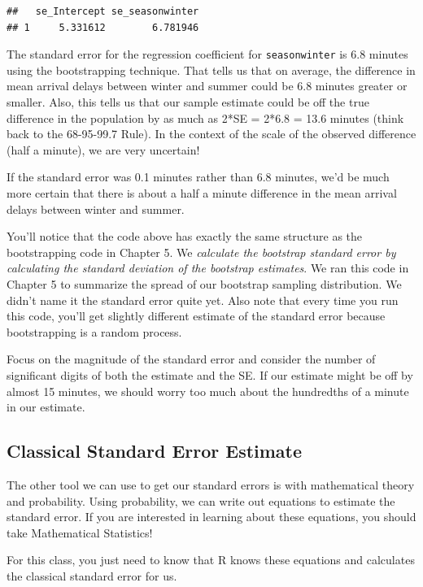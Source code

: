 \documentclass[
]{book}
\begin{document}
\begin{verbatim}
##   se_Intercept se_seasonwinter
## 1     5.331612        6.781946
\end{verbatim}

The standard error for the regression coefficient for \texttt{seasonwinter} is 6.8 minutes using the bootstrapping technique. That tells us that on average, the difference in mean arrival delays between winter and summer could be 6.8 minutes greater or smaller. Also, this tells us that our sample estimate could be off the true difference in the population by as much as 2*SE = 2*6.8 = 13.6 minutes (think back to the 68-95-99.7 Rule). In the context of the scale of the observed difference (half a minute), we are very uncertain!

If the standard error was 0.1 minutes rather than 6.8 minutes, we'd be much more certain that there is about a half a minute difference in the mean arrival delays between winter and summer.

You'll notice that the code above has exactly the same structure as the bootstrapping code in Chapter 5. We \emph{calculate the bootstrap standard error by calculating the standard deviation of the bootstrap estimates}. We ran this code in Chapter 5 to summarize the spread of our bootstrap sampling distribution. We didn't name it the standard error quite yet. Also note that every time you run this code, you'll get slightly different estimate of the standard error because bootstrapping is a random process.

Focus on the magnitude of the standard error and consider the number of significant digits of both the estimate and the SE. If our estimate might be off by almost 15 minutes, we should worry too much about the hundredths of a minute in our estimate.

\hypertarget{classical-standard-error-estimate}{%
\subsection{Classical Standard Error Estimate}\label{classical-standard-error-estimate}}

The other tool we can use to get our standard errors is with mathematical theory and probability. Using probability, we can write out equations to estimate the standard error. If you are interested in learning about these equations, you should take Mathematical Statistics!

For this class, you just need to know that R knows these equations and calculates the classical standard error for us.
\end{document}
